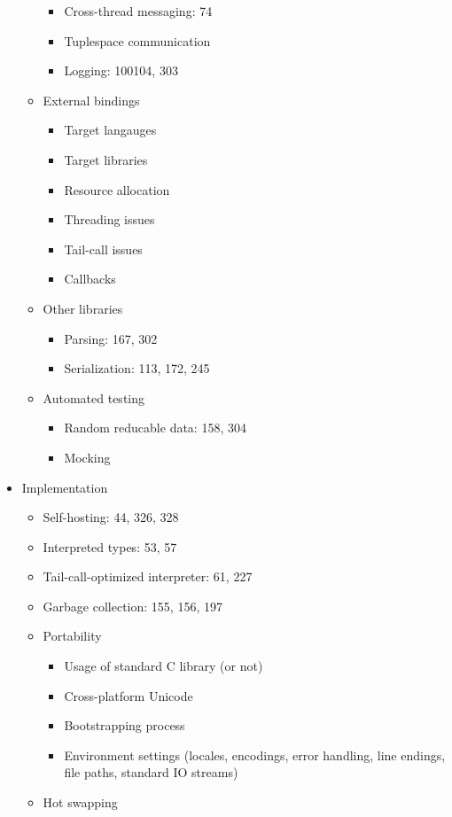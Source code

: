 \begin{itemize}
\begin{itemize}
\begin{itemize}
    \item Cross-thread messaging: 74
    \item Tuplespace communication
    \item Logging: 100104, 303
    \end{itemize}
  \item External bindings
    \begin{itemize}
    \item Target langauges
    \item Target libraries
    \item Resource allocation
    \item Threading issues
    \item Tail-call issues
    \item Callbacks
    \end{itemize}
  \item Other libraries
    \begin{itemize}
    \item Parsing: 167, 302
    \item Serialization: 113, 172, 245
    \end{itemize}
  \item Automated testing
    \begin{itemize}
    \item Random reducable data: 158, 304
    \item Mocking
    \end{itemize}
  \end{itemize}
\item Implementation
  \begin{itemize}
  \item Self-hosting: 44, 326, 328
  \item Interpreted types: 53, 57
  \item Tail-call-optimized interpreter: 61, 227
  \item Garbage collection: 155, 156, 197
  \item Portability
    \begin{itemize}
    \item Usage of standard C library (or not)
    \item Cross-platform Unicode
    \item Bootstrapping process
    \item Environment settings (locales, encodings, error handling, line endings, file paths, standard IO streams)
    \end{itemize}
  \item Hot swapping

\end{itemize}
\end{itemize}
